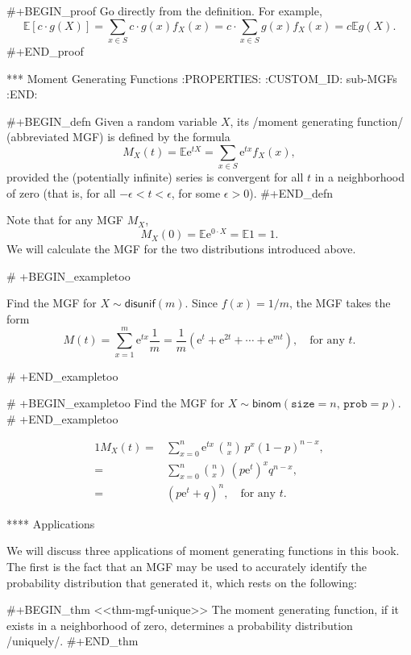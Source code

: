 #+BEGIN_proof
Go directly from the definition. For example, \[ \mathbb{E}[c \cdot
g(X)] = \sum_{x \in S} c \cdot g(x) f_{X}(x) = c \cdot \sum_{x \in S}
g(x) f_{X}(x) = c \mathbb{E} g(X).  \]
#+END_proof

*** Moment Generating Functions
:PROPERTIES:
:CUSTOM_ID: sub-MGFs
:END:

#+BEGIN_defn
Given a random variable \(X\), its /moment generating function/
(abbreviated MGF) is defined by the formula
\begin{equation}
M_{X}(t)=\mathbb{E}\mathrm{e}^{tX}=\sum_{x\in S}\mathrm{e}^{tx}f_{X}(x),
\end{equation}
provided the (potentially infinite) series is convergent for all \(t\)
in a neighborhood of zero (that is, for all \(-\epsilon < t <
\epsilon\), for some \(\epsilon > 0\)).
#+END_defn

Note that for any MGF \(M_{X}\),
\begin{equation}
M_{X}(0) = \mathbb{E} \mathrm{e}^{0 \cdot X} = \mathbb{E} 1 = 1.
\end{equation}
We will calculate the MGF for the two distributions introduced above.

# +BEGIN_exampletoo

Find the MGF for \(X\sim\mathsf{disunif}(m)\). Since \(f(x) = 1/m\),
the MGF takes the form \[ M(t) = \sum_{x = 1}^{m} \mathrm{e}^{tx}
\frac{1}{m} = \frac{1}{m}(\mathrm{e}^{t} + \mathrm{e}^{2t} + \cdots +
\mathrm{e}^{mt}),\quad \mbox{for any $t$.}  \]

# +END_exampletoo


# +BEGIN_exampletoo
Find the MGF for
\(X\sim\mathsf{binom}(\mathtt{size}=n,\,\mathtt{prob}=p)\).
# +END_exampletoo

\begin{alignat*}{1}
M_{X}(t)= & \sum_{x=0}^{n}\mathrm{e}^{tx}\,{n \choose x}\, p^{x}(1-p)^{n-x},\\
= & \sum_{x=0}^{n}{n \choose x}\,(p\mathrm{e}^{t})^{x}q^{n-x},\\
= & (p\mathrm{e}^{t}+q)^{n},\quad \mbox{for any $t$.}
\end{alignat*}

**** Applications

We will discuss three applications of moment generating functions in
this book. The first is the fact that an MGF may be used to accurately
identify the probability distribution that generated it, which rests
on the following:

#+BEGIN_thm
<<thm-mgf-unique>> The moment generating function, if it exists in a
neighborhood of zero, determines a probability distribution
/uniquely/.
#+END_thm


